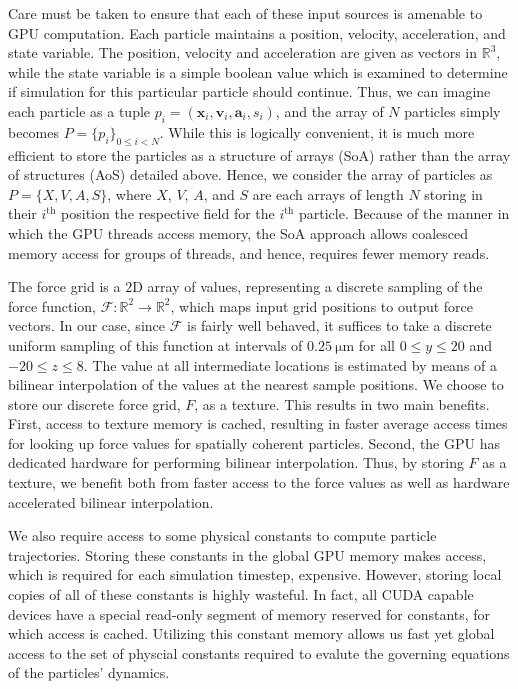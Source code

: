 Care must be taken to ensure that each of these input sources is
amenable to GPU computation.  Each particle maintains a position,
velocity, acceleration, and state variable.  The position, velocity
and acceleration are given as vectors in $\mathbb{R}^{3}$, while the
state variable is a simple boolean value which is examined to
determine if simulation for this particular particle should continue.
Thus, we can imagine each particle as a tuple $p_{i} =
(\mathbf{x}_{i}, \mathbf{v}_{i}, \mathbf{a}_{i}, s_{i})$, and the
array of $N$ particles simply becomes $P = \{p_{i}\}_{0 \le i < N}$.
While this is logically convenient, it is much more efficient to store
the particles as a structure of arrays (SoA) rather than the array of
structures (AoS) detailed above.  Hence, we consider the array of
particles as $P = \{X, V, A, S\}$, where $X$, $V$, $A$, and $S$ are
each arrays of length $N$ storing in their $i^\text{th}$ position the
respective field for the $i^\text{th}$ particle.  Because of the
manner in which the GPU threads access memory, the SoA approach allows
coalesced memory access for groups of threads, and hence, requires
fewer memory reads.

The force grid is a $2$D array of values, representing a discrete
sampling of the force function, $\mathcal{F} \colon
\mathbb{R}^{2} \to \mathbb{R}^{2}$, which maps input grid positions to
output force vectors.  In our case, since $\mathcal{F}$ is fairly well behaved,
it suffices to take a discrete uniform sampling of this function at
intervals of $\SI{0.25}{\micro\meter}$ for all $0 \le y \le 20$ and
$-20 \le z \le 8$.  The value at all intermediate locations is
estimated by means of a bilinear interpolation of the values at the
nearest sample positions.  We choose to store our discrete force grid,
$F$, as a texture.  This results in two main benefits.  First,
access to texture memory is cached, resulting in faster average access
times for looking up force values for spatially coherent particles.
Second, the GPU has dedicated hardware for performing bilinear
interpolation.  Thus, by storing $F$ as a texture, we benefit both
from faster access to the force values as well as hardware accelerated
bilinear interpolation.

We also require access to some physical constants to compute particle
trajectories.  Storing these constants in the global GPU memory makes
access, which is required for each simulation timestep, expensive.
However, storing local copies of all of these constants is highly
wasteful.  In fact, all CUDA capable devices have a special read-only
segment of memory reserved for constants, for which access is cached.
Utilizing this constant memory allows us fast yet global access to the
set of physcial constants required to evalute the governing equations
of the particles' dynamics.

